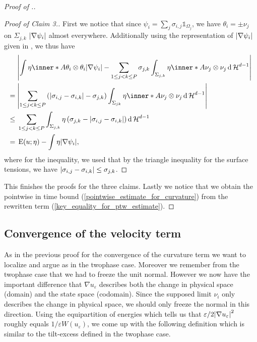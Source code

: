 \begin{proof}[Proof of .]
	\begin{proof}[Proof of Claim 3.]
		First we notice that since $ \psi_{ i } = \sum_{ j } \sigma_{ i , j } 
		\mathds{ 1 }_{ \Omega_{ j } } $, we have $ \theta_{ i } = \pm \nu_{ j } 
		$ on $ \Sigma_{ j , k } $ $ \abs{ \nabla \psi_{ i } }$ almost 
		everywhere.
		Additionally using the representation of $ \abs{ \nabla \psi_{ i } } $ 
		given in 
		, we thus have
		\begin{align*}
			&
			\abs{
				\int
					\eta 
					\inner*{ A }
					{ \theta_{ i } \otimes \theta_{ i } }
				\abs{ \nabla \psi_{ i } }
				-
				\sum_{ 1 \leq j < k \leq P }
					\sigma_{ j , k }
					\int_{ \Sigma_{ j , k } }
						\eta
						\inner*{ A }{ \nu_{ j } \otimes \nu_{ j } }
					\dd{ \hm^{ d - 1 } }
			}
			\\
			={} &
			\abs{ 
				\sum_{ 1 \leq j < k \leq P }
					\left( 
						\abs{ \sigma_{ i , j } - \sigma_{ i , k } }
						-
						\sigma_{ j , k }
					\right)
					\int_{ \Sigma_{ j k  } }
						\eta
						\inner*{ A }{ \nu_{ j } \otimes \nu_{ j } }
					\dd{ \hm^{ d - 1 } }
			}
			\\
			\leq{} &
			\sum_{ 1 \leq j < k \leq P }
				\int_{ \Sigma_{ j , k } }
					\eta
					\left(
						\sigma_{ j , k } - \abs{ \sigma_{ i , j } - \sigma_{ i 
						, k } }
					\right)
				\dd{ \hm^{ d - 1 } }
			\\
			={} &
			\energy ( u ; \eta )
			-
			\int
				\eta
			\abs{ \nabla \psi_{ i } },
		\end{align*}
		where for the inequality, we used that by the triangle inequality for 
		the surface tensions, we have
		$ \abs{ \sigma_{ i , j } - \sigma_{ i , k } } \leq \sigma_{ j , k } $.
	\end{proof}
	This finishes the proofs for the three claims. Lastly we notice that we 
	obtain the pointwise in time bound (\ref{pointwise_estimate_for_curvature}) 
	from the rewritten term (\ref{key_equality_for_ptw_estimate}).
\end{proof}

\subsection{Convergence of the velocity term}

As in the previous proof for the convergence of the curvature term we want to 
localize and argue as in the twophase case. Moreover we remember from the 
twophase case that we had to freeze the unit normal. However we now have the 
important difference that $ \nabla u_{ \varepsilon } $ describes both the 
change in physical space (domain) and the state space (codomain). Since the 
supposed limit $ \nu_{ i } $ only describes the change in physical space, we 
should only freeze the normal in this direction. Using the equipartition of 
energies  which tells us that $ 
\varepsilon / 2 \abs{ \nabla u_{ \varepsilon } }^{ 2 } $ roughly equals $ 1 / 
\varepsilon W ( u_{ \varepsilon } ) $, we come up with the following definition 
which is similar to the tilt-excess defined in the twophase case.


